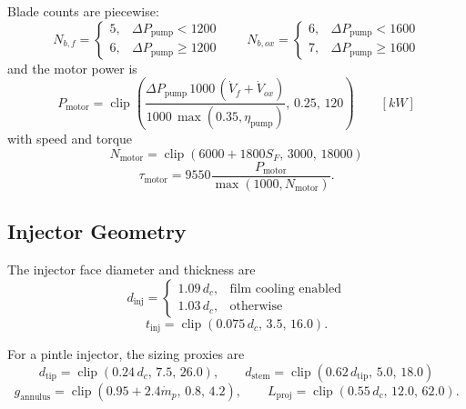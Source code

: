 \documentclass[11pt]{article}
\newcommand{\clip}{\operatorname{clip}}
\newcommand{\mdotp}{\dot{m}_{p}}
\begin{document}
Blade counts are piecewise:
\begin{equation}
N_{b,f}=
\begin{cases}
5, & \Delta P_{\text{pump}}<1200\\
6, & \Delta P_{\text{pump}}\ge 1200
\end{cases}
\qquad
N_{b,ox}=
\begin{cases}
6, & \Delta P_{\text{pump}}<1600\\
7, & \Delta P_{\text{pump}}\ge 1600
\end{cases}
\label{eq:blade-count}
\end{equation}
and the motor power is
\begin{equation}
P_{\text{motor}}
=
\clip\!\left(
\frac{\Delta P_{\text{pump}}\,1000\,(\dot{V}_f+\dot{V}_{ox})}{1000\,\max(0.35,\eta_{\text{pump}})},
\,
0.25,\,
120
\right)
\qquad [\si{kW}]
\label{eq:motor-power}
\end{equation}
with speed and torque
\begin{equation}
N_{\text{motor}}=\clip(6000+1800S_F,\,3000,\,18000)
\label{eq:motor-speed}
\end{equation}
\begin{equation}
\tau_{\text{motor}}=9550\frac{P_{\text{motor}}}{\max(1000,N_{\text{motor}})}.
\label{eq:motor-torque}
\end{equation}

\subsection{Injector Geometry}
The injector face diameter and thickness are
\begin{equation}
d_{\text{inj}}=
\begin{cases}
1.09\,d_c, & \text{film cooling enabled}\\
1.03\,d_c, & \text{otherwise}
\end{cases}
\label{eq:injector-face-dia}
\end{equation}
\begin{equation}
t_{\text{inj}}=\clip(0.075\,d_c,\,3.5,\,16.0).
\label{eq:injector-face-thickness}
\end{equation}

For a pintle injector, the sizing proxies are
\begin{equation}
d_{\text{tip}}=\clip(0.24\,d_c,\,7.5,\,26.0),
\qquad
d_{\text{stem}}=\clip(0.62\,d_{\text{tip}},\,5.0,\,18.0)
\label{eq:pintle-dia}
\end{equation}
\begin{equation}
g_{\text{annulus}}=\clip(0.95+2.4\mdotp,\,0.8,\,4.2),
\qquad
L_{\text{proj}}=\clip(0.55\,d_c,\,12.0,\,62.0).
\label{eq:pintle-geometry}
\end{equation}
\end{document}
